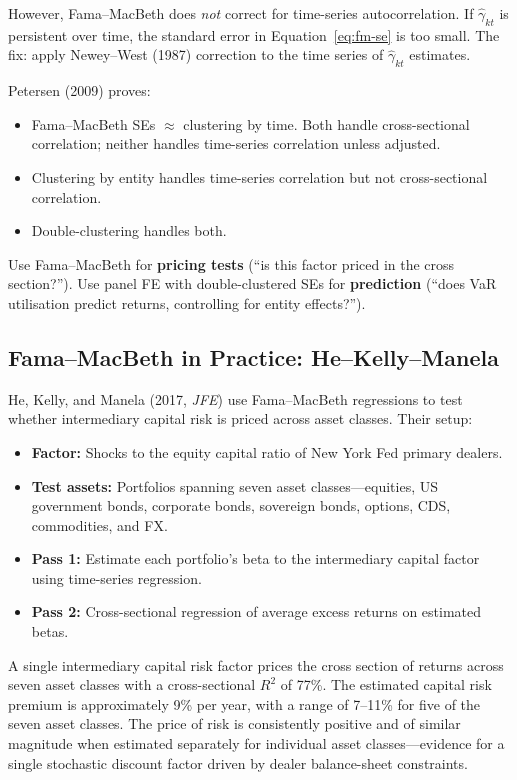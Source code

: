 However, Fama--MacBeth does \emph{not} correct for time-series autocorrelation.
If $\hat{\gamma}_{kt}$ is persistent over time, the standard error in Equation~\eqref{eq:fm-se} is too small.
The fix: apply Newey--West (1987) correction to the time series of $\hat{\gamma}_{kt}$ estimates.

\begin{prereq}
Petersen (2009) proves:
\begin{itemize}[leftmargin=*]
  \item Fama--MacBeth SEs $\approx$ clustering by time. Both handle cross-sectional correlation; neither handles time-series correlation unless adjusted.
  \item Clustering by entity handles time-series correlation but not cross-sectional correlation.
  \item Double-clustering handles both.
\end{itemize}
Use Fama--MacBeth for \textbf{pricing tests} (``is this factor priced in the cross section?'').
Use panel FE with double-clustered SEs for \textbf{prediction} (``does VaR utilisation predict returns, controlling for entity effects?'').
\end{prereq}

\subsection{Fama--MacBeth in Practice: He--Kelly--Manela}

He, Kelly, and Manela (2017, \textit{JFE}) use Fama--MacBeth regressions to test whether intermediary capital risk is priced across asset classes.
Their setup:

\begin{itemize}[leftmargin=*]
  \item \textbf{Factor:} Shocks to the equity capital ratio of New York Fed primary dealers.
  \item \textbf{Test assets:} Portfolios spanning seven asset classes---equities, US government bonds, corporate bonds, sovereign bonds, options, CDS, commodities, and FX.
  \item \textbf{Pass 1:} Estimate each portfolio's beta to the intermediary capital factor using time-series regression.
  \item \textbf{Pass 2:} Cross-sectional regression of average excess returns on estimated betas.
\end{itemize}

\begin{keyresult}
A single intermediary capital risk factor prices the cross section of returns across seven asset classes with a cross-sectional $R^2$ of 77\%.
The estimated capital risk premium is approximately 9\% per year, with a range of 7--11\% for five of the seven asset classes.
The price of risk is consistently positive and of similar magnitude when estimated separately for individual asset classes---evidence for a single stochastic discount factor driven by dealer balance-sheet constraints.
\end{keyresult}

